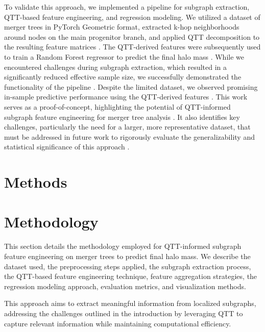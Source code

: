 \documentclass[twocolumn]{aastex631}
\begin{document}
To validate this approach, we implemented a pipeline for subgraph extraction, QTT-based feature engineering, and regression modeling.
We utilized a dataset of merger trees in PyTorch Geometric format, extracted k-hop neighborhoods around nodes on the main progenitor branch, and applied QTT decomposition to the resulting feature matrices \citep{jespersen2022textttmangrovelearninggalaxyproperties,jung2024mergertreebasedgalaxymatching}. The QTT-derived features were subsequently used to train a Random Forest regressor to predict the final halo mass \citep{robles2022deeplearningapproachhalo,jespersen2022textttmangrovelearninggalaxyproperties,jung2024mergertreebasedgalaxymatching}. While we encountered challenges during subgraph extraction, which resulted in a significantly reduced effective sample size, we successfully demonstrated the functionality of the pipeline \citep{jung2024mergertreebasedgalaxymatching}. Despite the limited dataset, we observed promising in-sample predictive performance using the QTT-derived features \citep{jespersen2022textttmangrovelearninggalaxyproperties}. This work serves as a proof-of-concept, highlighting the potential of QTT-informed subgraph feature engineering for merger tree analysis \citep{jespersen2022textttmangrovelearninggalaxyproperties,jung2024mergertreebasedgalaxymatching}. It also identifies key challenges, particularly the need for a larger, more representative dataset, that must be addressed in future work to rigorously evaluate the generalizability and statistical significance of this approach \citep{jung2024mergertreebasedgalaxymatching}.

\section{Methods}
\label{sec:methods}
\section{Methodology}
This section details the methodology employed for QTT-informed subgraph feature engineering on merger trees to predict final halo mass. We describe the dataset used, the preprocessing steps applied, the subgraph extraction process, the QTT-based feature engineering technique, feature aggregation strategies, the regression modeling approach, evaluation metrics, and visualization methods.

This approach aims to extract meaningful information from localized subgraphs, addressing the challenges outlined in the introduction by leveraging QTT to capture relevant information while maintaining computational efficiency.
\end{document}
